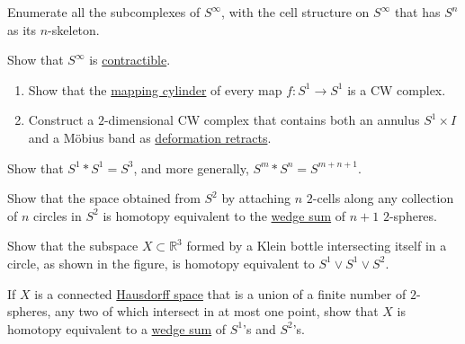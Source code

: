 	\begin{exercise}[Hatcher 0.15]
		Enumerate all the subcomplexes of $S^\infty$, with the cell structure on $S^\infty$ that has $S^n$ as its $n$-skeleton.
	\end{exercise}

	\begin{exercise}[Hatcher 0.16]
		Show that $S^\infty$ is \hyperref[def:contractible]{contractible}.
	\end{exercise}

	\begin{exercise}[Hatcher 0.17]
		\begin{enumerate}
			\item[(a)] Show that the \hyperref[def:mapping-cylinder]{mapping cylinder} of every map $f: S^1 \to S^1$ is a CW complex.
			\item[(b)] Construct a $2$-dimensional CW complex that contains both an annulus $S^1 \times I$ and a Möbius band as \hyperref[def:deformation-retract]{deformation retracts}.
		\end{enumerate}
	\end{exercise}

	\begin{exercise}[Hatcher 0.18]
		Show that $S^1 * S^1 = S^3$, and more generally, $S^m * S^n = S^{m+n+1}$.
	\end{exercise}

	\begin{exercise}[Hatcher 0.19]
		Show that the space obtained from $S^2$ by attaching $n$ $2$-cells along any collection of $n$ circles in $S^2$ is homotopy equivalent to the \hyperref[pst-def:wedge-sum]{wedge sum} of $n+1$ $2$-spheres.
	\end{exercise}

	\begin{exercise}[Hatcher 0.20]
		Show that the subspace $X \subset \mathbb{R}^3$ formed by a Klein bottle intersecting itself in a circle, as shown in the figure, is homotopy equivalent to $S^1 \vee S^1 \vee S^2$.
	\end{exercise}

	\begin{exercise}[Hatcher 0.21]
		If $X$ is a connected \hyperref[pst-def:hausdorff-space]{Hausdorff space} that is a union of a finite number of $2$-spheres, any two of which intersect in at most one point, show that $X$ is homotopy equivalent to a \hyperref[pst-def:wedge-sum]{wedge sum} of $S^1$'s and $S^2$'s.
	\end{exercise}

